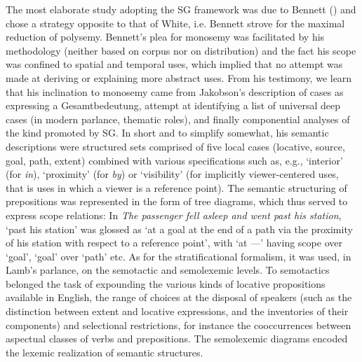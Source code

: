 \documentclass[english,output=paper,colorlinks,citecolor=brown]{../langscibook}
\begin{document}
The most elaborate study adopting the SG framework was due to Bennett (\citeyear{Bennett1975}) and chose a strategy opposite to that of White, i.e. Bennett strove for the maximal reduction of polysemy. Bennett’s plea for monosemy was facilitated by his methodology (neither based on corpus nor on distribution) and the fact his scope was confined to spatial and temporal uses, which implied that no attempt was made at deriving or explaining more abstract uses. From his testimony, we learn that his inclination to monosemy came from Jakobson’s description of cases as expressing a Gesamtbedeutung,  attempt at identifying a list of universal deep cases (in modern parlance, thematic roles), and finally componential analyses of the kind promoted by SG. In short and to simplify somewhat, his semantic descriptions were structured sets comprised of five local cases (locative, source, goal, path, extent) combined with various specifications such as, e.g., ‘interior’ (for \textit{in}), ‘proximity’ (for \textit{by}) or ‘visibility’ (for implicitly viewer-centered uses, that is uses in which a viewer is a reference point). The semantic structuring of prepositions was represented in the form of tree diagrams, which thus served to express scope relations: In \textit{The passenger fell asleep and went past his station}, ‘past his station’ was glossed as ‘at a goal at the end of a path via the proximity of his station with respect to a reference point’, with ‘at —’ having scope over ‘goal’, ‘goal’ over ‘path’ etc. As for the stratificational formalism, it was used, in Lamb’s parlance, on the semotactic and semolexemic levels. To semotactics belonged the task of expounding the various kinds of locative propositions available in English, the range of choices at the disposal of speakers (such as the distinction between extent and locative expressions, and the inventories of their components) and selectional restrictions, for instance the cooccurrences between aspectual classes of verbs and prepositions. The semolexemic diagrams encoded the lexemic realization of semantic structures.
\end{document}
